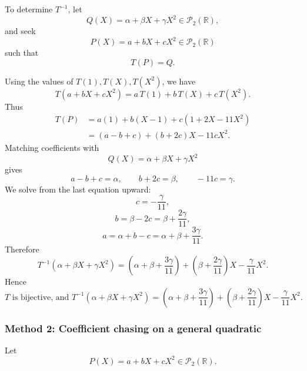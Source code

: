 \documentclass[12pt]{article}
\newcommand{\R}{\mathbb{R}}
\newcommand{\cP}{\mathcal{P}}
\begin{document}
\begin{enumerate}[label=(\alph*)]
To determine \(T^{-1}\), let
\[
Q(X)=\alpha+\beta X+\gamma X^2\in\cP_2(\R),
\]
and seek
\[
P(X)=a+bX+cX^2\in\cP_2(\R)
\]
such that
\[
T(P)=Q.
\]

Using the values of \(T(1),T(X),T(X^2)\), we have
\[
T(a+bX+cX^2)
=
a\,T(1)+b\,T(X)+c\,T(X^2).
\]
Thus
\begin{align*}
T(P)
&=a(1)+b(X-1)+c(1+2X-11X^2)\\
&=(a-b+c)+(b+2c)X-11cX^2.
\end{align*}
Matching coefficients with
\[
Q(X)=\alpha+\beta X+\gamma X^2
\]
gives
\[
a-b+c=\alpha,\qquad
b+2c=\beta,\qquad
-11c=\gamma.
\]
We solve from the last equation upward:
\[
c=-\frac{\gamma}{11},
\]
\[
b=\beta-2c=\beta+\frac{2\gamma}{11},
\]
\[
a=\alpha+b-c
=\alpha+\beta+\frac{3\gamma}{11}.
\]
Therefore
\[
T^{-1}(\alpha+\beta X+\gamma X^2)
=
\left(\alpha+\beta+\frac{3\gamma}{11}\right)
+
\left(\beta+\frac{2\gamma}{11}\right)X
-
\frac{\gamma}{11}X^2.
\]
Hence
\[
\boxed{
T \text{ is bijective, and }
T^{-1}(\alpha+\beta X+\gamma X^2)
=
\left(\alpha+\beta+\frac{3\gamma}{11}\right)
+
\left(\beta+\frac{2\gamma}{11}\right)X
-
\frac{\gamma}{11}X^2.}
\]
\end{enumerate}

\subsubsection{Method 2: Coefficient chasing on a general quadratic}
Let
\[
P(X)=a+bX+cX^2\in\cP_2(\R).
\]
\end{document}
